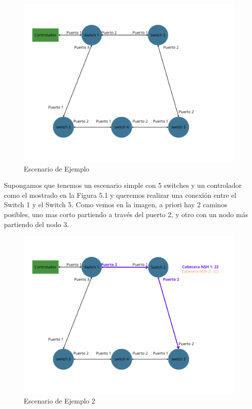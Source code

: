 \documentclass[a4paper, 12pt]{book}
\begin{document}
	\begin{figure}[H]
		\centering
		\includegraphics[width=16cm, keepaspectratio]{img/Ejemplo Periplus 1}
		\caption{Escenario de Ejemplo}
		\label{figura:PeriplusEj1}
	\end{figure}
	
	Supongamos que tenemos un escenario simple con 5 switches y un controlador como el mostrado en la Figura 5.1 y queremos realizar una conexión entre el Switch 1 y el Switch 5. Como vemos en la imagen, a priori hay 2 caminos posibles, uno mas corto partiendo a través del puerto 2, y otro con un nodo más partiendo del nodo 3. 
	
	\begin{figure}[H]
		\centering
		\includegraphics[width=16cm, keepaspectratio]{img/Ejemplo Periplus 2}
		\caption{Escenario de Ejemplo 2}
		\label{figura:PeriplusEj2}
	\end{figure}
	
\end{document}
